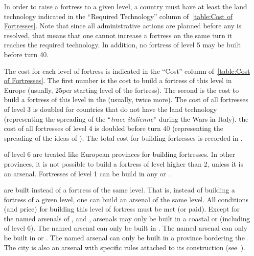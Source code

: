 \aparag[Technology.] In order to raise a fortress to a given level, a country
must have at least the land technology indicated in the ``Required
Technology'' column of~\ref{table:Cost of Fortresses}. Note that since all
administrative actions are planned before any is resolved, that means that one
cannot increase a fortress on the same turn it reaches the required
technology.
\bparag In addition, no fortress of level 5 may be built before turn 40.

\aparag[Cost.] The cost for each level of fortress is indicated in the
``Cost'' column of~\ref{table:Cost of Fortresses}.
\bparag The first number is the cost to build a fortress of this level in
Europe (usually, 25\ducats per starting level of the fortress). The second is
the cost to build a fortress of this level in the \ROTW (usually, twice more).
\bparag The cost of all fortresses of level 3 is doubled for countries that do
not have the land technology \TARQ (representing the spreading of the
``\emph{trace italienne}'' during the Wars in Italy).
\bparag the cost of all fortresses of level 4 is doubled before turn 40
(representing the spreading of the ideas of ).
\bparag The total cost for building fortresses is recorded in
.

\aparag[\ROTW.] \COL of level 6 are treated like European provinces for
building fortresses.
\bparag In other provinces, it is not possible to build a fortress of level
higher than 2, unless it is an arsenal.
\bparag Fortresses of level 1 can be build in any \COL or \TP.

\aparag[Arsenals]\label{chLogistic:Build Arsenals} are built instead of
a fortress of the same level. That is, instead of building a fortress of a
given level, one can build an arsenal of the same level. All conditions (and
price) for building this level of fortress must be met (or paid).
\bparag Except for the named arsenals of ,
 and , arsenals may
only be built in a coastal \TP or \COL (including \COL of level 6).
\bparag The named arsenal  can only be built in
.
\bparag The named arsenal  can only be built in
 or .
\bparag The named arsenal  can only be built in a
province bordering the \regionNoire.
\bparag The city  is also an arsenal
 with specific rules attached to its
construction (see~).

